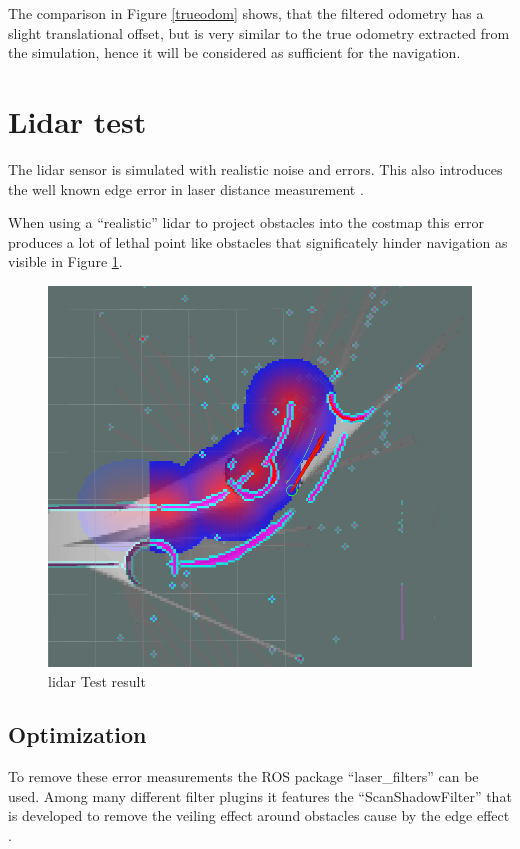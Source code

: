 The comparison in Figure \ref{trueodom} shows, that the filtered odometry has a slight translational offset, but is very similar to the true odometry extracted from the simulation, hence it will be considered as sufficient for the navigation.


\section{Lidar test}


The lidar sensor is simulated with realistic noise and errors. This also introduces the well known edge error in laser distance measurement \cite{edgeeffect}. 

When using a ``realistic'' lidar to project obstacles into the costmap this error produces a lot of lethal point like obstacles that significately hinder navigation as visible in Figure \ref{unfiltered lidar}.

\begin{figure}[H]
	\includegraphics[width=\textwidth]{Pictures/Needs filtering of Laser}
	\caption{lidar Test result}
	\label{unfiltered lidar}
\end{figure}

\subsection{Optimization}
To remove these error measurements the ROS package ``laser\_filters'' can be used. Among many different filter plugins it features the ``ScanShadowFilter'' that is developed to remove the veiling effect around obstacles cause by the edge effect \cite{laserfilters}.


